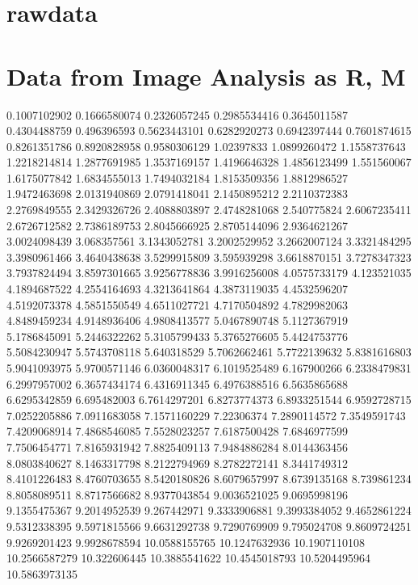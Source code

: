 \documentclass[draft=on]{scrbook}
\begin{document}
\section{rawdata}

\section{Data from Image Analysis as R, M}

\begin{minipage}{.5\textwidth}
 0.1007102902
0.1666580074
0.2326057245
0.2985534416
0.3645011587
0.4304488759
0.496396593
0.5623443101
0.6282920273
0.6942397444
0.7601874615
0.8261351786
0.8920828958
0.9580306129
1.02397833
1.0899260472
1.1558737643
1.2218214814
1.2877691985
1.3537169157
1.4196646328
1.4856123499
1.551560067
1.6175077842
1.6834555013
1.7494032184
1.8153509356
1.8812986527
1.9472463698
2.0131940869
2.0791418041
2.1450895212
2.2110372383
2.2769849555
2.3429326726
2.4088803897
2.4748281068
2.540775824
2.6067235411
2.6726712582
2.7386189753
2.8045666925
2.8705144096
2.9364621267
3.0024098439
3.068357561
3.1343052781
3.2002529952
3.2662007124
3.3321484295
3.3980961466
3.4640438638
3.5299915809
3.595939298
3.6618870151
3.7278347323
3.7937824494
3.8597301665
3.9256778836
3.9916256008
4.0575733179
4.123521035
4.1894687522
4.2554164693
4.3213641864
4.3873119035
4.4532596207
4.5192073378
4.5851550549
4.6511027721
4.7170504892
4.7829982063
4.8489459234
4.9148936406
4.9808413577
5.0467890748
5.1127367919
5.1786845091
5.2446322262
5.3105799433
5.3765276605
5.4424753776
5.5084230947
5.5743708118
5.640318529
5.7062662461
5.7722139632
5.8381616803
5.9041093975
5.9700571146
6.0360048317
6.1019525489
6.167900266
6.2338479831
6.2997957002
6.3657434174
6.4316911345
6.4976388516
6.5635865688
6.6295342859
6.695482003
6.7614297201
6.8273774373
6.8933251544
6.9592728715
7.0252205886
7.0911683058
7.1571160229
7.22306374
7.2890114572
7.3549591743
7.4209068914
7.4868546085
7.5528023257
7.6187500428
7.6846977599
7.7506454771
7.8165931942
7.8825409113
7.9484886284
8.0144363456
8.0803840627
8.1463317798
8.2122794969
8.2782272141
8.3441749312
8.4101226483
8.4760703655
8.5420180826
8.6079657997
8.6739135168
8.739861234
8.8058089511
8.8717566682
8.9377043854
9.0036521025
9.0695998196
9.1355475367
9.2014952539
9.267442971
9.3333906881
9.3993384052
9.4652861224
9.5312338395
9.5971815566
9.6631292738
9.7290769909
9.795024708
9.8609724251
9.9269201423
9.9928678594
10.0588155765
10.1247632936
10.1907110108
10.2566587279
10.322606445
10.3885541622
10.4545018793
10.5204495964
10.5863973135

\end{minipage}
\end{document}
